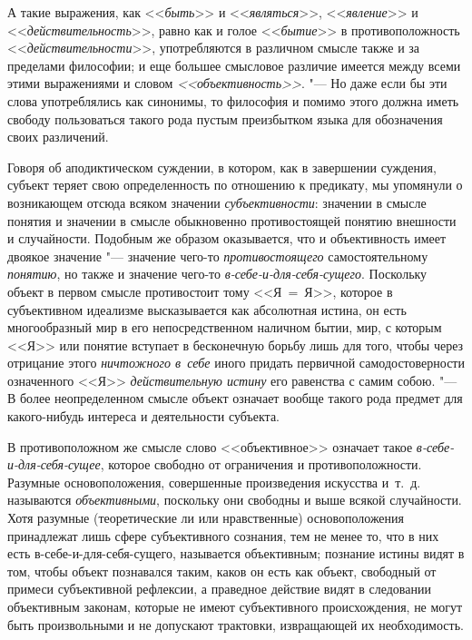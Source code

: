 А такие выражения, как <<{\em быть}>> и <<{\em являться}>>,
<<{\em явление}>> и <<{\em действительность}>>, равно как и голое
<<{\em бытие}>> в противоположность <<{\em действительности}>>,
употребляются в различном смысле также и за пределами
философии; и еще большее смысловое различие имеется между всеми этими
выражениями и словом {\em <<объективность>>}. "---
Но даже если бы эти слова употреблялись как синонимы, то
философия и помимо этого должна иметь свободу пользоваться такого рода
пустым преизбытком языка для обозначения своих различений.

Говоря об аподиктическом суждении, в котором, как в завершении
суждения, субъект теряет свою определенность по отношению к предикату, мы
упомянули о возникающем отсюда всяком значении {\em субъективности}:
значении в смысле понятия и значении в смысле обыкновенно
противостоящей понятию внешности и
случайности.
Подобным же образом оказывается, что и объективность имеет
двоякое значение "--- значение чего-то {\em противостоящего}
самостоятельному {\em понятию}, но также и значение чего-то
{\em в-себе-и-для-себя-сущего}.
Поскольку объект в первом смысле противостоит тому <<Я~=~Я>>,
которое в субъективном идеализме высказывается как абсолютная истина, он
есть многообразный мир в его непосредственном наличном
бытии, мир, с которым <<Я>> или понятие вступает в бесконечную борьбу лишь
для того, чтобы через отрицание этого {\em ничтожного в~себе}
иного придать первичной самодостоверности означенного <<Я>>
{\em действительную истину} его равенства с самим
собою.
"--- В более неопределенном смысле объект означает вообще такого
рода предмет для какого-нибудь интереса и деятельности субъекта.

В противоположном же смысле слово <<объективное>> означает такое
{\em в-себе-и-для-себя-сущее},
которое свободно от ограничения и противоположности. Разумные
основоположения, совершенные произведения искусства и~т.~д. называются
{\em объективными},
поскольку они свободны и выше всякой случайности. Хотя
разумные (теоретические ли или нравственные) основоположения принадлежат
лишь сфере субъективного сознания, тем не менее то, что в них есть
в-себе-и-для-себя-сущего, называется объективным; познание истины видят в
том, чтобы объект познавался таким, каков он есть как объект, свободный от
примеси субъективной рефлексии, а праведное действие видят в следовании
объективным законам, которые не имеют субъективного происхождения, не могут
быть произвольными и не допускают трактовки, извращающей их необходимость.

